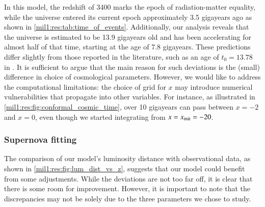 
In this model, the redshift of 3400 marks the epoch of radiation-matter equality, while the universe entered its current epoch approximately 3.5 gigayears ago as shown in \cref{mil1:res:tab:time_of_events}. Additionally, our analysis reveals that the universe is estimated to be 13.9 gigayears old and has been accelerating for almost half of that time, starting at the age of 7.8 gigayears. These predictions differ slightly from those reported in the literature, such as an age of $t_0=13.78$ in \citep{DodelsonBook}. It is sufficient to argue that the main reason for such deviations is the (small) difference in choice of cosmological parameters. However, we would like to address the computational limitations: the choice of grid for $x$ may introduce numerical vulnerabilities that propagate into other variables. For instance, as illustrated in \cref{mil1:res:fig:conformal_cosmic_time}, over 10 gigayears can pass between $x=-2$ and $x=0$, even though we started integrating from $x=x_\mathrm{init}=-20$.  







\subsubsection{Supernova fitting}
    The comparison of our model's luminosity distance with observational data, as shown in \cref{mil1:res:fig:lum_dist_vs_z}, suggests that our model could benefit from some adjustments. While the deviations are not too far off, it is clear that there is some room for improvement. However, it is important to note that the discrepancies may not be solely due to the three parameters we chose to study. 

